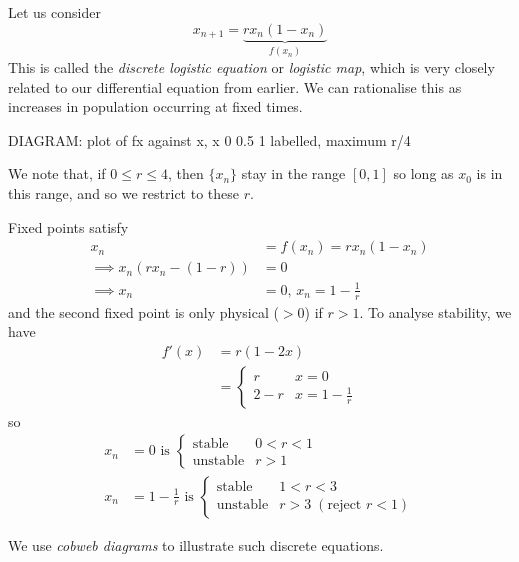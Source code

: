 \documentclass{../../template/note}
\begin{document}
    \begin{example}
        Let us consider
        \[
            x_{n+1} = \underbrace{rx_n(1-x_n)}_{f(x_n)}
        \]
        This is called the \emph{discrete logistic equation} or \emph{logistic map}, which is very closely related to our differential equation from earlier. We can rationalise this as increases in population occurring at fixed times.

        DIAGRAM: plot of fx against x, x 0 0.5 1 labelled, maximum r/4

        We note that, if \(0 \leq r \leq 4\), then \(\{x_n\}\) stay in the range \([0, 1]\) so long as \(x_0\) is in this range, and so we restrict to these \(r\).

        Fixed points satisfy
        \begin{align*}
            x_n &= f(x_n) = rx_n(1-x_n) \\
            \implies x_n(rx_n - (1-r)) &= 0 \\
            \implies x_n &= 0, \, x_n = 1 - \frac{1}{r}
        \end{align*}
        and the second fixed point is only physical (\(> 0\)) if \(r > 1\). To analyse stability, we have
        \begin{align*}
            f'(x) &= r(1-2x) \\
            &= \begin{cases}
                r & x = 0 \\
                2 - r & x = 1 - \frac{1}{r}
            \end{cases}
        \end{align*}
        so
        \begin{align*}
            x_n &= 0 \text{ is } \begin{cases}
                \text{stable} & 0 < r < 1 \\
                \text{unstable} & r > 1
            \end{cases} \\
            x_n &= 1 - \frac{1}{r} \text{ is } \begin{cases}
                \text{stable} & 1 < r < 3 \\
                \text{unstable} & r > 3 \; (\text{reject } r < 1)
            \end{cases}
        \end{align*}
    \end{example}

    We use \emph{cobweb diagrams} to illustrate such discrete equations.
    
\end{document}

